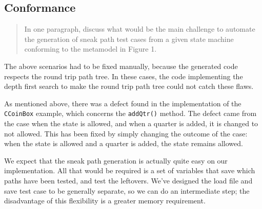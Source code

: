 \documentclass[ieee]{submit}
\begin{document}
\subsection{Conformance}

\begin{quote}
In one paragraph, discuss what would be the main challenge to automate the generation of sneak path test cases from a given state machine conforming to the metamodel in Figure 1.
\end{quote}

The above scenarios had to be fixed manually, because the generated code respects the round trip path tree. In these cases, the code implementing the depth first search to make the round trip path tree could not catch these flaws. 

	As mentioned above, there was a defect found in the implementation of the {\tt CCoinBox} example, which concerns the {\tt addQtr()} method. The defect came from the case when the state is allowed, and when a quarter is added, it is changed to not allowed. This has been fixed by simply changing the outcome of the case: when the state is allowed and a quarter is added, the state remains allowed.

We expect that the sneak path generation is actually quite easy on our implementation. All that would be required is a set of variables that save which paths have been tested, and test the leftovers. We've designed the load file and save test case to be generally separate, so we can do an intermediate step; the disadvantage of this flexibility is a greater memory requirement.

\received{\thedate}{\thedate}{\thedate}
\end{document}
